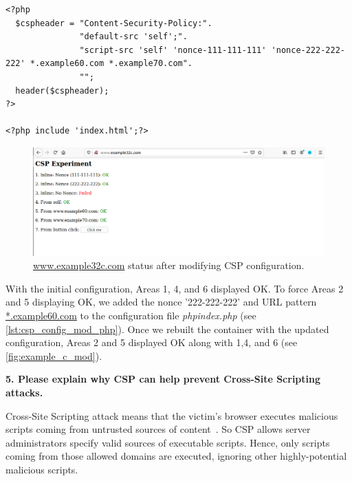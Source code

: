 \begin{lstlisting}[caption=Modified CSP configuration by PHP web application.,
    label={lst:csp_config_mod_php}]
<?php
  $cspheader = "Content-Security-Policy:".
               "default-src 'self';".
               "script-src 'self' 'nonce-111-111-111' 'nonce-222-222-222' *.example60.com *.example70.com".
               "";
  header($cspheader);
?>

<?php include 'index.html';?>
\end{lstlisting}

\begin{figure}[h]
    \centering
    \includegraphics[height=\textheight,width=\textwidth,keepaspectratio]
    {figures/example_c_modified.png}
    \caption{\url{www.example32c.com} status after modifying CSP configuration.}
    \label{fig:example_c_mod}
\end{figure}

With the initial configuration, Areas 1, 4, and 6 displayed OK. To force Areas 2 and 5 displaying
OK, we added the nonce '222-222-222' and URL pattern \url{*.example60.com} to the configuration
file \emph{phpindex.php} (see \autoref{lst:csp_config_mod_php}). Once we rebuilt the container
with the updated configuration, Areas 2 and 5 displayed OK along with 1,4, and 6 (see
\autoref{fig:example_c_mod}).

\textbf{5. Please explain why CSP can help prevent Cross-Site Scripting attacks.}

Cross-Site Scripting attack means that the victim's browser executes malicious
scripts coming from untrusted sources of content~\cite{csp}. So CSP allows server administrators
specify valid sources of executable scripts. Hence, only scripts coming from those
allowed domains are executed, ignoring other highly-potential malicious scripts.